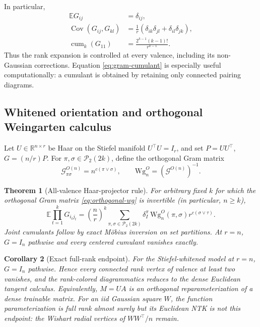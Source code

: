 \documentclass{article}
\newtheorem{theorem}{Theorem}[section]
\newtheorem{corollary}[theorem]{Corollary}
\newcommand{\E}{\mathbb E}
\newcommand{\R}{\mathbb R}
\newcommand{\cP}{\mathcal P}
\newcommand{\Cov}{\operatorname{Cov}}
\newcommand{\cum}{\operatorname{cum}}
\begin{document}
In particular,
\begin{align}
\E G_{ij}&=\delta_{ij},\label{eq:gram-mean}\\
\Cov(G_{ij},G_{kl})
&=\frac1r(\delta_{ik}\delta_{jl}+\delta_{il}\delta_{jk}),
\label{eq:gram-cov}\\
\cum_k(G_{11})&=\frac{2^{k-1}(k-1)!}{r^{k-1}}.
\label{eq:gram-diag-cumulant}
\end{align}
Thus the rank expansion is controlled at every valence, including its
non-Gaussian corrections.  Equation \eqref{eq:gram-cumulant} is especially
useful computationally: a cumulant is obtained by retaining only connected
pairing diagrams.

\subsection{Whitened orientation and orthogonal Weingarten calculus}

Let \(U\in\R^{n\times r}\) be Haar on the Stiefel manifold
\(U^\top U=I_r\), and set \(P=UU^\top\), \(G=(n/r)P\).  For
\(\pi,\sigma\in\cP_2(2k)\), define the orthogonal Gram matrix
\begin{equation}
\mathcal G^{O(n)}_{\pi\sigma}=n^{c(\pi\vee\sigma)},
\qquad
\mathrm{Wg}^{O}_n=(\mathcal G^{O(n)})^{-1}.
\label{eq:orthogonal-wg}
\end{equation}

\begin{theorem}[All-valence Haar-projector rule]
\label{thm:projector-weingarten}
For arbitrary fixed \(k\) for which the orthogonal Gram matrix
\eqref{eq:orthogonal-wg} is invertible (in particular, \(n\ge k\)),
\begin{equation}
\E\prod_{t=1}^kG_{i_tj_t}
=\left(\frac nr\right)^k
\sum_{\pi,\sigma\in\cP_2(2k)}
\delta_I^\pi\,\mathrm{Wg}^{O}_n(\pi,\sigma)
r^{c(\sigma\vee\tau)}.
\label{eq:projector-moment}
\end{equation}
Joint cumulants follow by exact M\"obius inversion on set partitions.
At \(r=n\), \(G=I_n\) pathwise and every centered cumulant vanishes exactly.
\end{theorem}

\begin{corollary}[Exact full-rank endpoint]
\label{cor:full-rank-endpoint}
For the Stiefel-whitened model at \(r=n\), \(G=I_n\) pathwise.  Hence every
connected rank vertex of valence at least two vanishes, and the rank-colored
diagrammatics reduces to the dense Euclidean tangent calculus.  Equivalently,
\(M=UA\) is an orthogonal reparameterization of a dense trainable matrix.
For an iid Gaussian square \(W\), the function parameterization is full rank
almost surely but its Euclidean NTK is not this endpoint: the Wishart radial
vertices of \(WW^\top/n\) remain.
\end{corollary}
\end{document}
